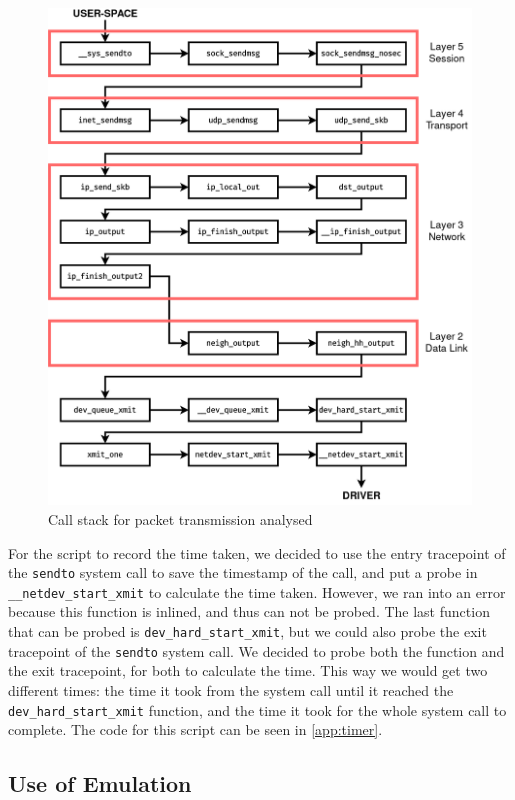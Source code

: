 \begin{figure}[htb]
   \centering
   \includegraphics[scale=.4]{callstack2}
   \caption{Call stack for packet transmission analysed}\label{fig:callstack}
\end{figure}

For the script to record the time taken, we decided to use the entry tracepoint
of the \texttt{sendto} system call to save the timestamp of the call, and put a
probe in \texttt{\_\_netdev\_start\_xmit} to calculate the time taken. However,
we ran into an error because this function is inlined, and thus can not be
probed. The last function that can be probed is \texttt{dev\_hard\_start\_xmit},
but we could also probe the exit tracepoint of the \texttt{sendto} system call.
We decided to probe both the function and the exit tracepoint, for both to
calculate the time. This way we would get two different times: the time it took
from the system call until it reached the \texttt{dev\_hard\_start\_xmit}
function, and the time it took for the whole system call to complete. The code
for this script can be seen in \autoref{app:timer}.


\subsection{Use of Emulation}

